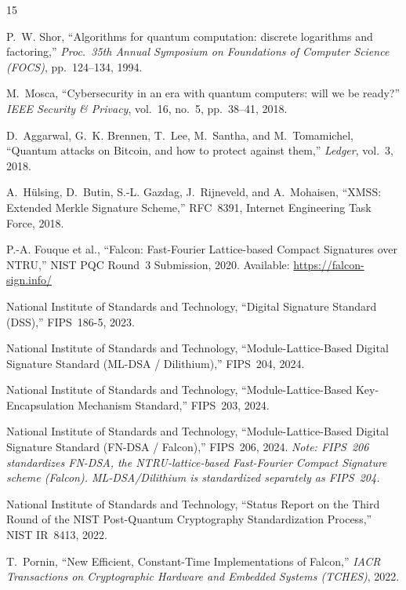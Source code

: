 \documentclass[11pt,a4paper]{article}
\begin{document}
\begin{thebibliography}{15}

P.~W. Shor,
``Algorithms for quantum computation: discrete logarithms and factoring,''
\textit{Proc.\ 35th Annual Symposium on Foundations of Computer Science (FOCS)},
pp.~124--134, 1994.

M.~Mosca,
``Cybersecurity in an era with quantum computers: will we be ready?''
\textit{IEEE Security \& Privacy}, vol.~16, no.~5, pp.~38--41, 2018.

D.~Aggarwal, G.~K. Brennen, T.~Lee, M.~Santha, and M.~Tomamichel,
``Quantum attacks on Bitcoin, and how to protect against them,''
\textit{Ledger}, vol.~3, 2018.

A.~H\"{u}lsing, D.~Butin, S.-L. Gazdag, J.~Rijneveld, and A.~Mohaisen,
``XMSS: Extended Merkle Signature Scheme,''
RFC~8391, Internet Engineering Task Force, 2018.

P.-A. Fouque et al.,
``Falcon: Fast-Fourier Lattice-based Compact Signatures over NTRU,''
NIST PQC Round~3 Submission, 2020.
Available: \url{https://falcon-sign.info/}

National Institute of Standards and Technology,
``Digital Signature Standard (DSS),''
FIPS~186-5, 2023.

National Institute of Standards and Technology,
``Module-Lattice-Based Digital Signature Standard (ML-DSA / Dilithium),''
FIPS~204, 2024.

National Institute of Standards and Technology,
``Module-Lattice-Based Key-Encapsulation Mechanism Standard,''
FIPS~203, 2024.

National Institute of Standards and Technology,
``Module-Lattice-Based Digital Signature Standard (FN-DSA / Falcon),''
FIPS~206, 2024.
\emph{Note: FIPS~206 standardizes FN-DSA, the NTRU-lattice-based Fast-Fourier
Compact Signature scheme (Falcon). ML-DSA/Dilithium is standardized separately
as FIPS~204.}

National Institute of Standards and Technology,
``Status Report on the Third Round of the NIST Post-Quantum Cryptography
Standardization Process,''
NIST IR~8413, 2022.

T.~Pornin,
``New Efficient, Constant-Time Implementations of Falcon,''
\textit{IACR Transactions on Cryptographic Hardware and Embedded Systems
(TCHES)}, 2022.


\end{thebibliography}
\end{document}
